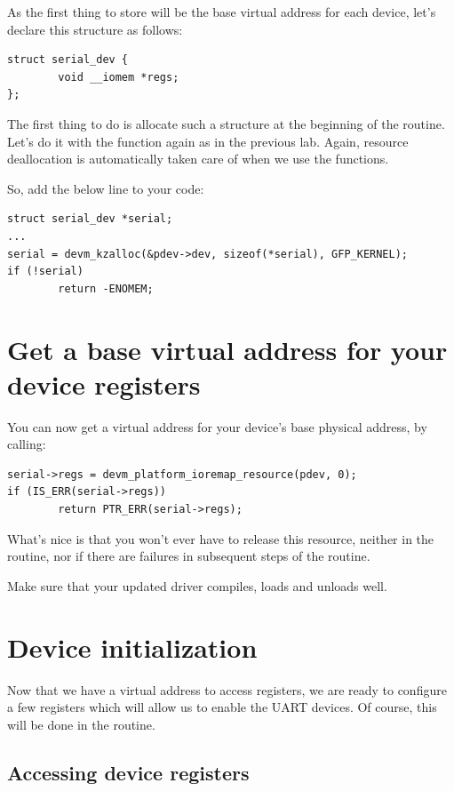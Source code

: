 As the first thing to store will be the base virtual address for
each device, let's declare this structure as follows:

\begin{verbatim}
struct serial_dev {
        void __iomem *regs;
};
\end{verbatim}

The first thing to do is allocate such a structure at the beginning
of the  routine. Let's do it with the 
function again as in the previous lab. Again, resource deallocation is
automatically taken care of when we use the  functions.

So, add the below line to your code:

\begin{verbatim}
struct serial_dev *serial;
...
serial = devm_kzalloc(&pdev->dev, sizeof(*serial), GFP_KERNEL);
if (!serial)
        return -ENOMEM;
\end{verbatim}

\section{Get a base virtual address for your device registers}

You can now get a virtual address for your device's base physical
address, by calling:

\begin{verbatim}
serial->regs = devm_platform_ioremap_resource(pdev, 0);
if (IS_ERR(serial->regs))
        return PTR_ERR(serial->regs);
\end{verbatim}

What's nice is that you won't ever have to release this resource,
neither in the  routine, nor if there are failures
in subsequent steps of the  routine.

Make sure that your updated driver compiles, loads and unloads well.

\section{Device initialization}

Now that we have a virtual address to access registers, we are ready to
configure a few registers which will allow us to enable the UART
devices. Of course, this will be done in the  routine.

\subsection{Accessing device registers}

